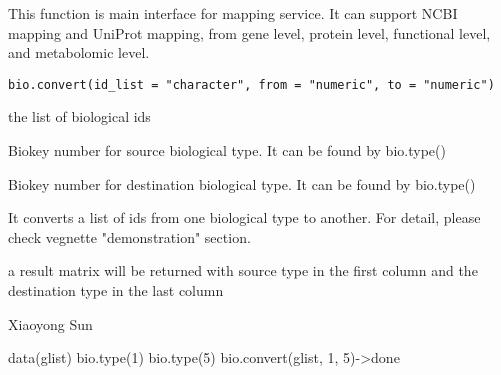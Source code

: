 \begin{Description}\relax
This function is main interface for mapping service. It can support NCBI 
mapping and UniProt mapping, from gene level, protein level, functional level,
and metabolomic level.
\end{Description}
\begin{Usage}
\begin{verbatim}
bio.convert(id_list = "character", from = "numeric", to = "numeric")
\end{verbatim}
\end{Usage}
\begin{Arguments}
\begin{ldescription}
\item[\code{id\_list}] the list of biological ids
\item[\code{from}] Biokey number for source biological type. It can be found by bio.type()
\item[\code{to}] Biokey number for destination biological type. It can be found by bio.type()
\end{ldescription}
\end{Arguments}
\begin{Details}\relax
It converts a list of ids from one biological type to another. For detail, please check vegnette "demonstration" section.
\end{Details}
\begin{Value}
a result matrix will be returned with source type in the first column and the destination type
in the last column
\end{Value}
\begin{Author}\relax
Xiaoyong Sun
\end{Author}
\begin{Examples}
\begin{ExampleCode}

data(glist)
bio.type(1)
bio.type(5)
bio.convert(glist, 1, 5)->done
\end{ExampleCode}
\end{Examples}

